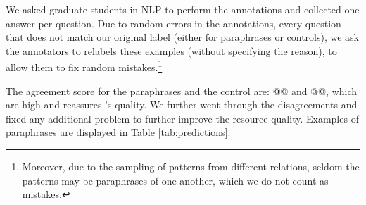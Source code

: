 We asked graduate students in NLP to perform the annotations and collected one answer per question.
Due to random errors in the annotations,  every question that does not match our original label (either for paraphrases or controls), we ask the annotators to relabels  these examples (without specifying the reason), to allow them to fix random mistakes.\footnote{Moreover, due to the sampling of patterns from different relations, seldom the patterns may be paraphrases of one another, which we do not count as mistakes.}

The agreement score for the paraphrases and the control are: @@ and @@, which are high and reassures \resource's quality.
We further went through the disagreements  %
and fixed any additional problem %
to further improve the resource quality.
Examples of paraphrases are displayed in Table \ref{tab:predictions}. 
% 

